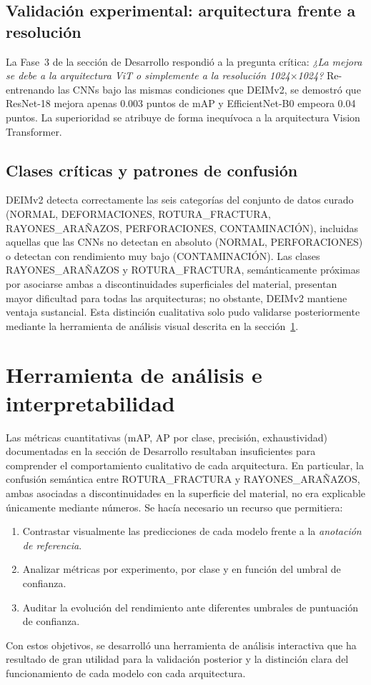 \subsection{Validación experimental: arquitectura frente a resolución}

La Fase~3 de la sección de Desarrollo respondió a la pregunta crítica: \textit{¿La mejora se debe a la arquitectura \acrshort{ViT} o simplemente a la resolución 1024$\times$1024?} Re-entrenando las CNNs bajo las mismas condiciones que DEIMv2, se demostró que ResNet-18 mejora apenas 0.003 puntos de mAP y EfficientNet-B0 empeora 0.04 puntos. La superioridad se atribuye de forma inequívoca a la arquitectura Vision Transformer.

\subsection{Clases críticas y patrones de confusión}

DEIMv2 detecta correctamente las seis categorías del conjunto de datos curado (NORMAL, DEFORMACIONES, \mbox{ROTURA\_FRACTURA}, \mbox{RAYONES\_ARAÑAZOS}, PERFORACIONES, CONTAMINACIÓN), incluidas aquellas que las CNNs no detectan en absoluto (NORMAL, PERFORACIONES) o detectan con rendimiento muy bajo (CONTAMINACIÓN). Las clases \mbox{RAYONES\_ARAÑAZOS} y \mbox{ROTURA\_FRACTURA}, semánticamente próximas por asociarse ambas a discontinuidades superficiales del material, presentan mayor dificultad para todas las arquitecturas; no obstante, DEIMv2 mantiene ventaja sustancial. Esta distinción cualitativa solo pudo validarse posteriormente mediante la herramienta de análisis visual descrita en la sección~\ref{sec:herramienta_analisis}.


\section{Herramienta de análisis e interpretabilidad}
\label{sec:herramienta_analisis}

Las métricas cuantitativas (mAP, AP por clase, precisión, exhaustividad) documentadas en la sección de Desarrollo resultaban insuficientes para comprender el comportamiento cualitativo de cada arquitectura. En particular, la confusión semántica entre \mbox{ROTURA\_FRACTURA} y \mbox{RAYONES\_ARAÑAZOS}, ambas asociadas a discontinuidades en la superficie del material, no era explicable únicamente mediante números. Se hacía necesario un recurso que permitiera:
\begin{enumerate}
    \item Contrastar visualmente las predicciones de cada modelo frente a la \textit{anotación de referencia}.
    \item Analizar métricas por experimento, por clase y en función del umbral de confianza.
    \item Auditar la evolución del rendimiento ante diferentes umbrales de puntuación de confianza.
\end{enumerate}
Con estos objetivos, se desarrolló una herramienta de análisis interactiva que ha resultado de gran utilidad para la validación posterior y la distinción clara del funcionamiento de cada modelo con cada arquitectura.

